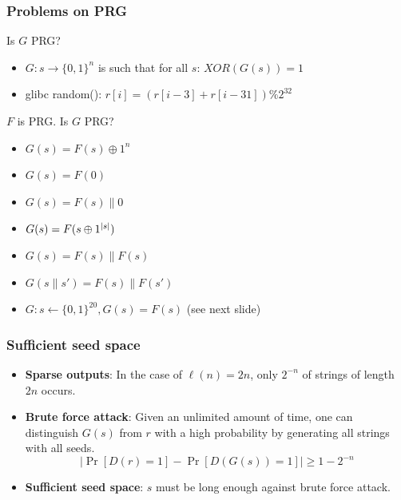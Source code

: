 \begin{frame}\frametitle{Problems on PRG}
\begin{exampleblock}{Is $G$ PRG?}
\begin{itemize}
\item $G: s \to \{0,1\}^n$ is such that for all $s$: $XOR(G(s)) = 1$
\item glibc random(): $r[i] = (r[i-3] + r[i-31])\%2^{32}$
\end{itemize}
\end{exampleblock}
\begin{exampleblock}{$F$ is PRG. Is $G$ PRG?}
\begin{itemize}
\item $G(s)=F(s)\oplus 1^{n}$
\item $G(s)=F(0)$
\item $G(s)=F(s)\| 0$
\item $G(s)=F(s\oplus 1^{\lvert s\rvert})$
\item $G(s)=F(s)\| F(s)$
\item $G(s\| s')=F(s)\| F(s')$
\item $G: s \gets \{0,1\}^{20}, G(s) = F(s)$ (see next slide)
\end{itemize}
\end{exampleblock}
\end{frame}
\begin{frame}\frametitle{Sufficient seed space}
\begin{itemize}
\item \textbf{Sparse outputs}: In the case of $\ell(n)=2n$, only $2^{-n}$ of strings of length $2n$ occurs.
\item \textbf{Brute force attack}: Given an unlimited amount of time, one can distinguish $G(s)$ from $r$ with a high probability by generating all strings with all seeds.
\[  \left|\Pr[D(r)=1] - \Pr[D(G(s))=1]\right| \ge 1-2^{-n} \]
\item \textbf{Sufficient seed space}: $s$ must be long enough against brute force attack.
\end{itemize}
\end{frame}
